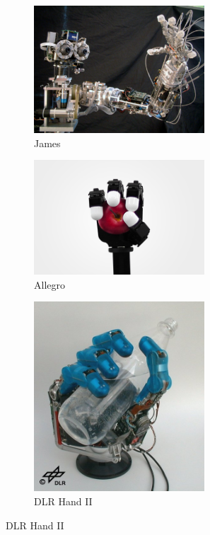 \begin{figure}
\begin{subfigure}{.3\linewidth}
        \label{fig:Sandia}
    \end{subfigure}
    \begin{subfigure}{.3\linewidth}
        \centering
        \includegraphics[width=0.7\textwidth]{Images/James.png}    \caption{James}
        \label{fig:James}
    \end{subfigure}
    \begin{subfigure}{.3\linewidth}
        \centering
        \includegraphics[width=0.7\textwidth]{Images/Allegro_Hand_flash_03.png}
        \caption{Allegro}
        \label{fig:Allegro}
    \end{subfigure}
    \begin{subfigure}{.3\linewidth}
        \centering
        \includegraphics[width=0.7\textwidth]{Images/Hand-II-01.jpg}    \caption{DLR Hand II}

\end{subfigure}
\end{figure}
